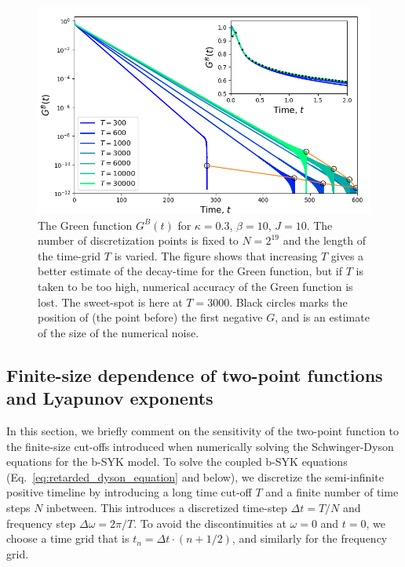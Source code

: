 \begin{figure}[h]
	\centering
	\includegraphics[width=1.0\columnwidth]{figures/chapter1/FiniteSizeAnalysis.png}
	\caption{The Green function $G^B(t)$ for $\kappa=0.3$, $\beta=10$, $J=10$. 
		The number of discretization points is fixed to $N=2^{19}$ and the length of the time-grid $T$ is varied.
		The figure shows that increasing $T$ gives a better estimate of the decay-time for the Green function, but if $T$ is taken to be too high, numerical accuracy of the Green function is lost. The sweet-spot is here at $T=3000$.
		Black circles marks the position of (the point before) the first negative $G$, and is an estimate of the size of the numerical noise.     
	}
	\label{fig:FiniteSize}
\end{figure}



\subsection{Finite-size dependence of two-point functions and Lyapunov exponents}\label{app:FiniteSize}
In this section, we briefly comment on the sensitivity of the two-point function to the finite-size cut-offs introduced when numerically solving the Schwinger-Dyson equations for the b-SYK model.
To solve the coupled b-SYK equations (Eq.~\eqref{eq:retarded_dyson_equation} and below), we discretize the semi-infinite positive timeline by introducing a long time cut-off $T$ and a finite number of time steps $N$ inbetween. 
This introduces a discretized time-step $\Delta t=T/N$ and frequency step $\Delta \omega = 2 \pi / T$.
To avoid the discontinuities at $\omega=0$ and $t = 0$, we choose a time grid that is $t_n = \Delta t \cdot (n+1/2)$, and similarly for the frequency grid.

